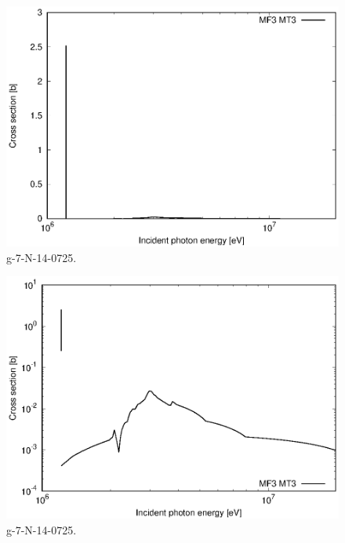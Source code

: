 \begin{figure}
 \includegraphics[width=\linewidth]{eps/g_7-N-14_0725.eps}
  \caption{g-7-N-14-0725.}
\end{figure}
\begin{figure}
 \includegraphics[width=\linewidth]{eps-log/g_7-N-14_0725.eps}
 \caption{g-7-N-14-0725.}
\end{figure}
\newpage \clearpage

